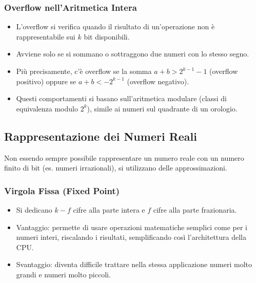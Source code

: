 \documentclass[12pt, a4paper]{article}
\begin{document}
\subsubsection*{Overflow nell'Aritmetica Intera}
\begin{itemize}
    \item L'overflow si verifica quando il risultato di un'operazione non è rappresentabile sui $k$ bit disponibili. 
    \item Avviene solo se si sommano o sottraggono due numeri con lo stesso segno. 
    \item Più precisamente, c'è overflow se la somma $a+b > 2^{k-1} - 1$ (overflow positivo) oppure se $a+b < -2^{k-1}$ (overflow negativo). 
    \item Questi comportamenti si basano sull'aritmetica modulare (classi di equivalenza modulo $2^k$), simile ai numeri sul quadrante di un orologio. 
\end{itemize}

\newpage

\subsection{Rappresentazione dei Numeri Reali}

Non essendo sempre possibile rappresentare un numero reale con un numero finito di bit (es. numeri irrazionali), si utilizzano delle approssimazioni. 

\subsubsection*{Virgola Fissa (Fixed Point)}
\begin{itemize}
    \item Si dedicano $k-f$ cifre alla parte intera e $f$ cifre alla parte frazionaria. 
    \item Vantaggio: permette di usare operazioni matematiche semplici come per i numeri interi, riscalando i risultati, semplificando così l'architettura della CPU. 
    \item Svantaggio: diventa difficile trattare nella stessa applicazione numeri molto grandi e numeri molto piccoli. 
\end{itemize}
\end{document}

